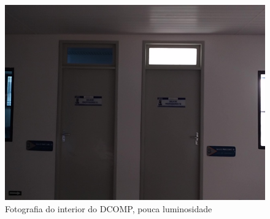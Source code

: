 \begin{figure}[H]
	\centering
		\includegraphics[width= \textwidth]{Imagens/figura4-18.jpg}
	\caption{Fotografia do interior do DCOMP, pouca luminosidade}
	\label{fig4:18}
\end{figure}